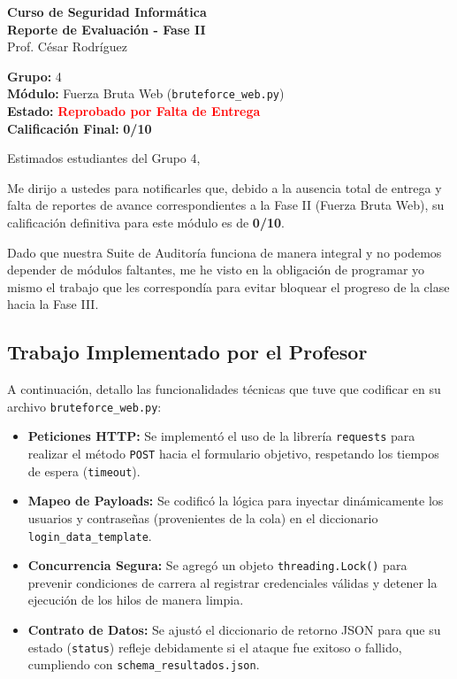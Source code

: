 \documentclass[12pt,letterpaper]{article}
\begin{document}
\begin{center}
    \Large \textbf{Curso de Seguridad Informática} \\
    \large \textbf{Reporte de Evaluación - Fase II} \\
    \vspace{0.3cm}
    \normalsize Prof. César Rodríguez \\
\end{center}

\vspace{0.5cm}

\noindent \textbf{Grupo:} 4 \\
\textbf{Módulo:} Fuerza Bruta Web (\texttt{bruteforce\_web.py}) \\
\textbf{Estado:} \textcolor{red}{\textbf{Reprobado por Falta de Entrega}} \\
\textbf{Calificación Final:} \textbf{0/10}

\vspace{0.5cm}

\noindent Estimados estudiantes del Grupo 4,

\vspace{0.3cm}
Me dirijo a ustedes para notificarles que, debido a la ausencia total de entrega y falta de reportes de avance correspondientes a la Fase II (Fuerza Bruta Web), su calificación definitiva para este módulo es de \textbf{0/10}. 

Dado que nuestra Suite de Auditoría funciona de manera integral y no podemos depender de módulos faltantes, me he visto en la obligación de programar yo mismo el trabajo que les correspondía para evitar bloquear el progreso de la clase hacia la Fase III.

\subsection*{Trabajo Implementado por el Profesor}
A continuación, detallo las funcionalidades técnicas que tuve que codificar en su archivo \texttt{bruteforce\_web.py}:
\begin{itemize}
    \item \textbf{Peticiones HTTP:} Se implementó el uso de la librería \texttt{requests} para realizar el método \texttt{POST} hacia el formulario objetivo, respetando los tiempos de espera (\texttt{timeout}).
    \item \textbf{Mapeo de Payloads:} Se codificó la lógica para inyectar dinámicamente los usuarios y contraseñas (provenientes de la cola) en el diccionario \texttt{login\_data\_template}.
    \item \textbf{Concurrencia Segura:} Se agregó un objeto \texttt{threading.Lock()} para prevenir condiciones de carrera al registrar credenciales válidas y detener la ejecución de los hilos de manera limpia.
    \item \textbf{Contrato de Datos:} Se ajustó el diccionario de retorno JSON para que su estado (\texttt{status}) refleje debidamente si el ataque fue exitoso o fallido, cumpliendo con \texttt{schema\_resultados.json}.
\end{itemize}
\end{document}
